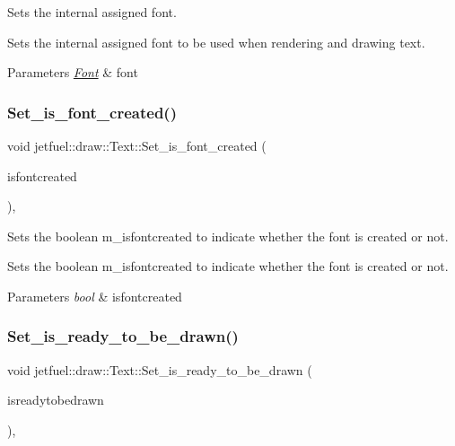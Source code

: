 Sets the internal assigned font. 

Sets the internal assigned font to be used when rendering and drawing text.


\begin{DoxyParams}{Parameters}
{\em \hyperlink{classjetfuel_1_1draw_1_1Font}{Font}} & font \\
\hline
\end{DoxyParams}
\mbox{\label{classjetfuel_1_1draw_1_1Text_a62bbae5ffafd2dbc327b79719c84d253}} 
\subsubsection{\texorpdfstring{Set\+\_\+is\+\_\+font\+\_\+created()}{Set\_is\_font\_created()}}
{\footnotesize\ttfamily void jetfuel\+::draw\+::\+Text\+::\+Set\+\_\+is\+\_\+font\+\_\+created (\begin{DoxyParamCaption}\item[{bool}]{isfontcreated }\end{DoxyParamCaption})\hspace{0.3cm}{\ttfamily [inline]}, {\ttfamily [protected]}}



Sets the boolean m\+\_\+isfontcreated to indicate whether the font is created or not. 

Sets the boolean m\+\_\+isfontcreated to indicate whether the font is created or not.


\begin{DoxyParams}{Parameters}
{\em bool} & isfontcreated \\
\hline
\end{DoxyParams}
\mbox{\label{classjetfuel_1_1draw_1_1Text_a9d7e2d4cd2ca03fa2ca03f91964b26f7}} 
\subsubsection{\texorpdfstring{Set\+\_\+is\+\_\+ready\+\_\+to\+\_\+be\+\_\+drawn()}{Set\_is\_ready\_to\_be\_drawn()}}
{\footnotesize\ttfamily void jetfuel\+::draw\+::\+Text\+::\+Set\+\_\+is\+\_\+ready\+\_\+to\+\_\+be\+\_\+drawn (\begin{DoxyParamCaption}\item[{bool}]{isreadytobedrawn }\end{DoxyParamCaption})\hspace{0.3cm}{\ttfamily [inline]}, {\ttfamily [protected]}}




